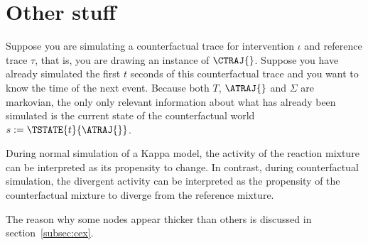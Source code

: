 \section*{Other stuff}

Suppose you are simulating a counterfactual trace for intervention
$\iota$ and reference trace $\tau$, that is, you are drawing an
instance of $\CTRAJ{}$. Suppose you have already simulated the first
$t$ seconds of this counterfactual trace and you want to know the time
of the next event. Because both $T$, $\ATRAJ{}$ and $\Sigma$ are
markovian, the only only relevant information about what has already
been simulated is the current state of the counterfactual world
$s := \TSTATE{t}{\ATRAJ{}}$.

During normal simulation of a Kappa model, the activity of the
reaction mixture can be interpreted as its propensity to change. In
contrast, during counterfactual simulation, the divergent activity can
be interpreted as the propensity of the counterfactual mixture to
diverge from the reference mixture.

The reason why some nodes appear thicker than others is discussed in
section~\ref{subsec:cex}.


